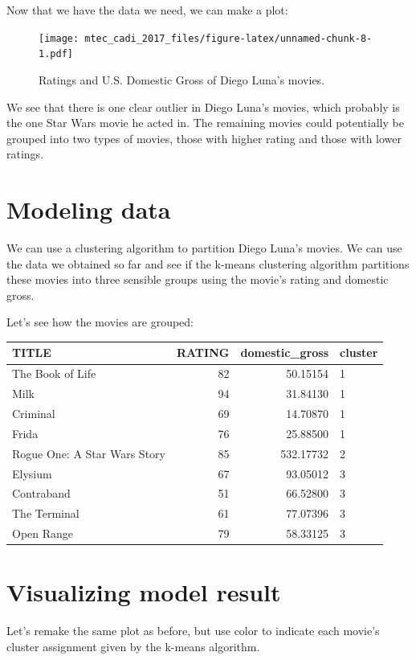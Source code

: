 \documentclass[12pt,]{book}
\theoremstyle{definition}
\theoremstyle{definition}
\theoremstyle{definition}
\theoremstyle{remark}
\begin{document}
Now that we have the data we need, we can make a plot:

\begin{figure}
\centering
\texttt{[image: mtec\_cadi\_2017\_files/figure-latex/unnamed-chunk-8-1.pdf]}
\caption{\label{fig:unnamed-chunk-8}Ratings and U.S. Domestic Gross of Diego
Luna's movies.}
\end{figure}

We see that there is one clear outlier in Diego Luna's movies, which
probably is the one Star Wars movie he acted in. The remaining movies
could potentially be grouped into two types of movies, those with higher
rating and those with lower ratings.

\section{Modeling data}\label{modeling-data}

We can use a clustering algorithm to partition Diego Luna's movies. We
can use the data we obtained so far and see if the k-means clustering
algorithm partitions these movies into three sensible groups using the
movie's rating and domestic gross.

Let's see how the movies are grouped:

\begin{tabular}{l|r|r|l}
\hline
TITLE & RATING & domestic\_gross & cluster\\
\hline
The Book of Life & 82 & 50.15154 & 1\\
\hline
Milk & 94 & 31.84130 & 1\\
\hline
Criminal & 69 & 14.70870 & 1\\
\hline
Frida & 76 & 25.88500 & 1\\
\hline
Rogue One: A Star Wars Story & 85 & 532.17732 & 2\\
\hline
Elysium & 67 & 93.05012 & 3\\
\hline
Contraband & 51 & 66.52800 & 3\\
\hline
The Terminal & 61 & 77.07396 & 3\\
\hline
Open Range & 79 & 58.33125 & 3\\
\hline
\end{tabular}

\section{Visualizing model result}\label{visualizing-model-result}

Let's remake the same plot as before, but use color to indicate each
movie's cluster assignment given by the k-means algorithm.
\end{document}
